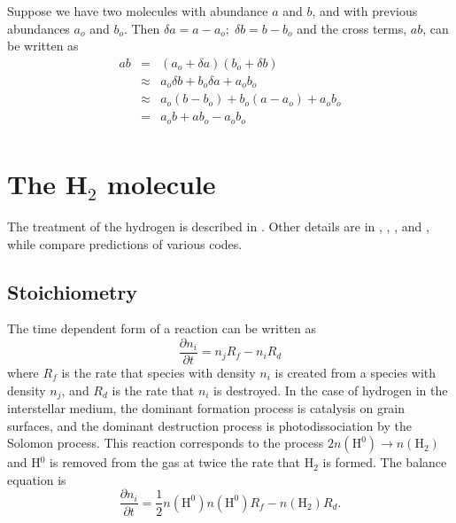 Suppose we have two molecules with abundance $a$ and $b$, and with previous
abundances $a_o$ and $b_o$.  Then $\delta a = a - {a_o};\;\delta b = b -
{b_o}$ and the cross terms, $ab$, can be written as
\begin{equation}
\begin{array}{ccc}
 ab& =& \left( {{a_o} + \delta a} \right)\left( {{b_o} + \delta b} \right) \\
&\approx& {a_o}\delta b + {b_o}\delta a + {a_o}{b_o} \\
&\approx& {a_o}\left( {b - {b_o}} \right) + {b_o}\left( {a - {a_o}} \right)
+ {a_o}{b_o} \\
& =& {a_o}b + a{b_o} - {a_o}{b_o} \\
 \end{array}
\end{equation}

\section{The H$_2$ molecule}

The treatment of the hydrogen is described in \citet{Shaw2005}.  Other
details are in \citet{Ferland1989},
\citet{Ferland1994}, \citet{FerlandFabian2002}, and \citet{Abel2005}, while \citet{Roellig2007} compare
predictions of various codes.

\subsection{Stoichiometry}

The time dependent form of a reaction can be written as
\begin{equation}
\frac{{\partial {n_i}}}{{\partial t}} = {n_j}{R_f} - {n_i}{R_d}
\end{equation}
where $R_f$ is the rate that species with density $n_i$ is created from a species
with density $n_j$, and $R_d$ is the rate that $n_i$ is destroyed.  In the case of
hydrogen in the interstellar medium, the dominant formation process is
catalysis on grain surfaces, and the dominant destruction process is
photodissociation by the Solomon process.  This reaction corresponds to
the process $2n\left( {{{\mathrm{H}}^0}} \right) \to n\left( {{{\mathrm{H}}_2}}
\right)$
 and H$^0$ is removed from the gas at twice the rate that H$_2$ is formed.  The
balance equation is
\begin{equation}
\label{eqn:H2FormationBlance}
\frac{{\partial {n_i}}}{{\partial t}} = \frac{1}{2}n\left( {{{\mathrm{H}}^0}}
\right)n\left( {{{\mathrm{H}}^0}} \right){R_f} - n\left( {{{\mathrm{H}}_2}}
\right){R_d}.
\end{equation}

